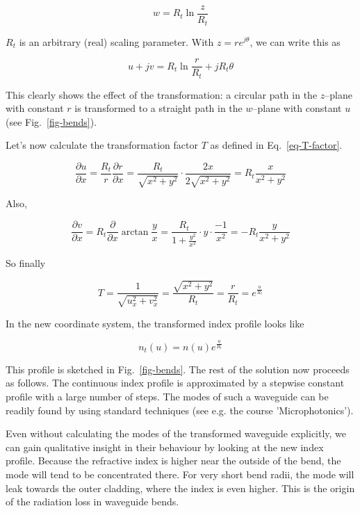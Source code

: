 \begin{equation}
w = R_t \ln \frac{z}{R_t}
\end{equation} 

$R_t$ is an arbitrary (real) scaling parameter. With $z=r e^{j \theta}$, we can
write this as

\begin{equation}
u + jv = R_t \ln \frac{r}{R_t} + j R_t \theta
\end{equation} 

This clearly shows the effect of the transformation: a circular path in the
$z$--plane with constant $r$ is transformed to a straight path in the $w$--plane
with constant $u$ (see Fig.~\ref{fig-bends}).

Let's now calculate the transformation factor $T$ as defined in
Eq.~\ref{eq-T-factor}.

\begin{equation}
\frac{\partial u}{\partial x} = \frac{R_t}{r}\frac{\partial r}{\partial x} = 
\frac{R_t}{\sqrt{x^2+y^2}} \cdot \frac{2x}{2\sqrt{x^2+y^2}} = R_t
\frac{x}{x^2+y^2}
\end{equation} 

Also,

\begin{equation}
\frac{\partial v}{\partial x} = R_t \frac{\partial}{\partial x} \arctan
\frac{y}{x} = \frac{R_t}{1 + \frac{y^2}{x^2}} \cdot y \cdot \frac{-1}{x^2}= -R_t
\frac{y}{x^2+y^2}
\end{equation} 

So finally

\begin{equation}
T = \frac{1}{\sqrt{u_x^2+v_x^2}} = \frac{\sqrt{x^2+y^2}}{R_t} =
\frac{r}{R_t}=e^{\frac{u}{R_t}}
\end{equation} 

In the new coordinate system, the transformed index profile looks like

\begin{equation}
n_t(u) = n(u)e^{\frac{u}{R_t}}
\end{equation} 

This profile is sketched in Fig.~\ref{fig-bends}. The rest of the solution now
proceeds as follows. The continuous index profile is approximated by a stepwise
constant profile with a large number of steps. The modes of such a waveguide can
be readily found by using standard techniques (see e.g. the course
'Microphotonics').

Even without calculating the modes of the transformed waveguide explicitly, we
can gain qualitative insight in their behaviour by looking at the new index
profile. Because the refractive index  is higher near the outside of the bend,
the mode will tend to be concentrated there. For very short bend radii, the mode
will leak towards the outer cladding, where the index is even higher. This is
the origin of the radiation loss in waveguide bends.

